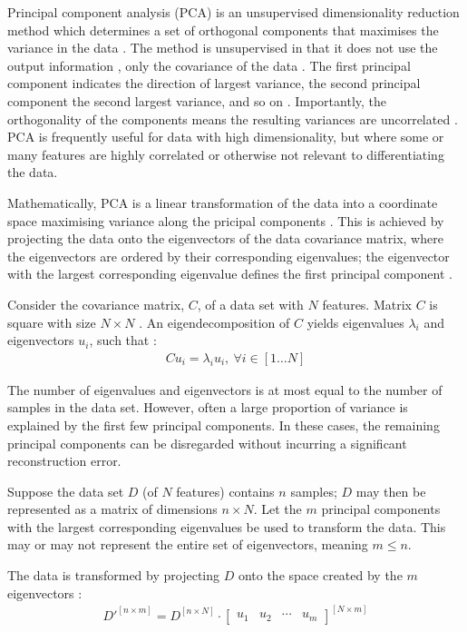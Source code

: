 Principal component analysis (PCA) is an unsupervised dimensionality reduction method which determines a set of orthogonal components that maximises the variance in the data \cite{alpaydin_2020} \cite{lovell_2008}. The method is unsupervised in that it does not use the output information \cite{alpaydin_2020}, only the covariance of the data \cite{lovell_2008}. The first principal component indicates the direction of largest variance, the second principal component the second largest variance, and so on \cite{alpaydin_2020}. Importantly, the orthogonality of the components means the resulting variances are uncorrelated \cite{alpaydin_2020}. PCA is frequently useful for data with high dimensionality, but where some or many features are highly correlated or otherwise not relevant to differentiating the data.

Mathematically, PCA is a linear transformation of the data into a coordinate space maximising variance along the pricipal components \cite{jolliffe_2002}. This is achieved by projecting the data onto the eigenvectors of the data covariance matrix, where the eigenvectors are ordered by their corresponding eigenvalues; the eigenvector with the largest corresponding eigenvalue defines the first principal component \cite{rosebrock_2021}.

Consider the covariance matrix, $C$, of a data set with $N$ features. Matrix $C$ is square with size $N\times N$ \cite{lovell_2008}. An eigendecomposition of $C$ yields eigenvalues $\lambda_i$ and eigenvectors $u_i$, such that \cite{lovell_2008}:
\begin{align}
  C u_i = \lambda_i u_i,\ \forall i \in [1 \ldots N]
\end{align}

The number of eigenvalues and eigenvectors is at most equal to the number of samples in the data set. However, often a large proportion of variance is explained by the first few principal components. In these cases, the remaining principal components can be disregarded without incurring a significant reconstruction error.

Suppose the data set $D$ (of $N$ features) contains $n$ samples; $D$ may then be represented as a matrix of dimensions $n\times N$. Let the $m$ principal components with the largest corresponding eigenvalues be used to transform the data. This may or may not represent the entire set of eigenvectors, meaning $m\leq n$.

The data is transformed by projecting $D$ onto the space created by the $m$ eigenvectors \cite{rosebrock_2021}:
\begin{align}
  D'^{[n\times m]} = D^{[n\times N]} \cdot \begin{bmatrix} u_1 & u_2 & \cdots & u_m \end{bmatrix}^{[N\times m]}
\end{align}

